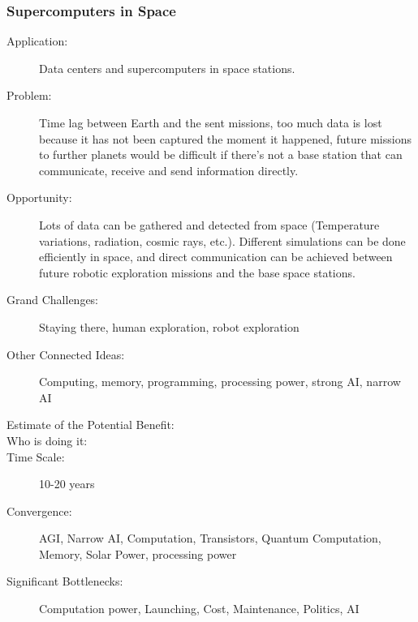 \subsubsection{Supercomputers in Space }
\label{supercom}
\begin{description}  \item[Application:] Data centers and supercomputers in space stations.
\item[Problem:] Time lag between  Earth and the sent missions, too much data is lost because it has not  been captured the moment it happened, future missions to further planets  would be difficult if there's not a base station that can communicate,  receive and send information directly.
\item[Opportunity:] 
Lots of data can be gathered and  detected from space (Temperature variations, radiation, cosmic rays,  etc.). Different simulations can be done efficiently in space, and  direct communication can be achieved between future robotic exploration  missions and the base space stations.
\item[Grand  Challenges:] Staying there, human exploration, robot exploration
\item[Other Connected Ideas:] Computing, memory, programming,  processing power, strong AI, narrow AI
\item[Estimate  of the Potential Benefit:] 
\item[Who  is doing it:]
\item[Time Scale:] 10-20 years
\item[Convergence:] \gls{AGI}, Narrow  AI, Computation, Transistors, Quantum Computation, Memory, Solar Power,  processing power
\item[Significant Bottlenecks:]  Computation power, Launching, Cost, Maintenance, Politics, AI
\end{description}
 
